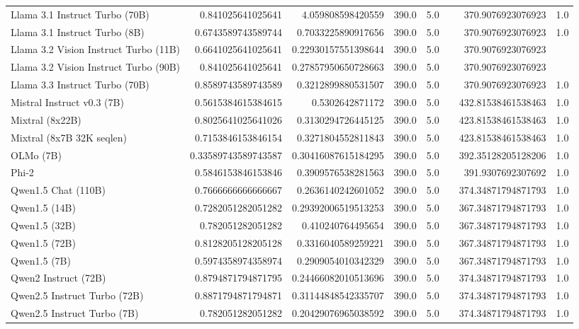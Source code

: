 \begin{table}[htp]
{\begin{tabular}{lrrrrrrr}
Llama 3.1 Instruct Turbo (70B) & 0.841025641025641 & 4.059808598420559 & 390.0 & 5.0 &  & 370.9076923076923 & 1.0 \\
Llama 3.1 Instruct Turbo (8B) & 0.6743589743589744 & 0.7033225890917656 & 390.0 & 5.0 &  & 370.9076923076923 & 1.0 \\
Llama 3.2 Vision Instruct Turbo (11B) & 0.6641025641025641 & 0.22930157551398644 & 390.0 & 5.0 &  & 370.9076923076923 &  \\
Llama 3.2 Vision Instruct Turbo (90B) & 0.841025641025641 & 0.27857950650728663 & 390.0 & 5.0 &  & 370.9076923076923 &  \\
Llama 3.3 Instruct Turbo (70B) & 0.8589743589743589 & 0.3212899880531507 & 390.0 & 5.0 &  & 370.9076923076923 & 1.0 \\
Mistral Instruct v0.3 (7B) & 0.5615384615384615 & 0.5302642871172 & 390.0 & 5.0 &  & 432.81538461538463 & 1.0 \\
Mixtral (8x22B) & 0.8025641025641026 & 0.3130294726445125 & 390.0 & 5.0 &  & 423.81538461538463 & 1.0 \\
Mixtral (8x7B 32K seqlen) & 0.7153846153846154 & 0.3271804552811843 & 390.0 & 5.0 &  & 423.81538461538463 & 1.0 \\
OLMo (7B) & 0.33589743589743587 & 0.30416087615184295 & 390.0 & 5.0 &  & 392.35128205128206 & 1.0 \\
Phi-2 & 0.5846153846153846 & 0.3909576538281563 & 390.0 & 5.0 &  & 391.9307692307692 & 1.0 \\
Qwen1.5 Chat (110B) & 0.7666666666666667 & 0.2636140242601052 & 390.0 & 5.0 &  & 374.34871794871793 & 1.0 \\
Qwen1.5 (14B) & 0.7282051282051282 & 0.29392006519513253 & 390.0 & 5.0 &  & 367.34871794871793 & 1.0 \\
Qwen1.5 (32B) & 0.782051282051282 & 0.410240764495654 & 390.0 & 5.0 &  & 367.34871794871793 & 1.0 \\
Qwen1.5 (72B) & 0.8128205128205128 & 0.3316040589259221 & 390.0 & 5.0 &  & 367.34871794871793 & 1.0 \\
Qwen1.5 (7B) & 0.5974358974358974 & 0.2909054010342329 & 390.0 & 5.0 &  & 367.34871794871793 & 1.0 \\
Qwen2 Instruct (72B) & 0.8794871794871795 & 0.24466082010513696 & 390.0 & 5.0 &  & 374.34871794871793 & 1.0 \\
Qwen2.5 Instruct Turbo (72B) & 0.8871794871794871 & 0.31144848542335707 & 390.0 & 5.0 &  & 374.34871794871793 & 1.0 \\
Qwen2.5 Instruct Turbo (7B) & 0.782051282051282 & 0.20429076965038592 & 390.0 & 5.0 &  & 374.34871794871793 & 1.0 \\

\end{tabular}}
\end{table}
